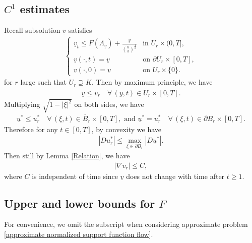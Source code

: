 \documentclass[reqno]{amsart}
\theoremstyle{remark}
\theoremstyle{definition}
\numberwithin{equation}{section}
\begin{document}
\subsection{\texorpdfstring{$C^1$}{C1} estimates}

Recall subsolution $\underline{v}$ satisfies
\begin{align}
    \begin{cases}
    \underline{v}_t \leqslant F(\Lambda_{\underline{v}}) + \frac{\underline{v}}{\binom{n}{k}^{\frac{1}{k}}} & \text{in } U_r \times (0, T], \\[4pt]
    \underline{v}(\cdot, t) = \underline{v} & \text{on } \partial U_r \times [0, T], \\[4pt]
    \underline{v}(\cdot, 0) = \underline{v} & \text{on } U_r \times \{0\}.
    \end{cases}
\end{align}
for $r$ large such that $U_r \supseteq K$. Then by maximum principle, we have
\begin{align*}
    \underline{v} \leqslant v_r \quad \forall \, (y,t) \in \overline{U}_r \times [0, T].
\end{align*}
Multiplying $\sqrt{1-|\xi|^2}$ on both sides, we have
\begin{align*}
    \underline{u}^* \leqslant u^*_r \quad \forall \, (\xi,t) \in \overline{B}_r \times [0, T], \text{ and  }
     \underline{u}^* = u^*_r \quad \forall \, (\xi,t) \in \partial B_r \times [0, T].
\end{align*}
Therefore for any $t \in [0, T]$, by convexity we have
\begin{align*}
    |Du^*_r| \leqslant \max_{\xi \in \partial B_r} |D \underline{u}^*|.
\end{align*}
Then still by Lemma \ref{Relation}, we have 
\begin{align*}
    |\nabla v_r| \leqslant C,
\end{align*}
where $C$ is independent of time since $\underline{v}$ does not change with time after $t \geqslant 1$.


\subsection{Upper and lower bounds for \texorpdfstring{$F$}{F}}

For convenience, we omit the subscript when considering approximate problem \eqref{approximate normalized support function flow}.
\end{document}
